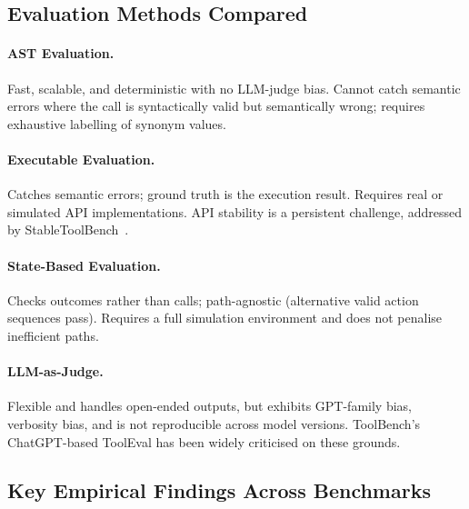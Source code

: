 \documentclass[11pt]{article}
\begin{document}
\subsection{Evaluation Methods Compared}

\paragraph{AST Evaluation.}
Fast, scalable, and deterministic with no LLM-judge bias. Cannot catch semantic errors where the
call is syntactically valid but semantically wrong; requires exhaustive labelling of synonym values.

\paragraph{Executable Evaluation.}
Catches semantic errors; ground truth is the execution result. Requires real or simulated API
implementations. API stability is a persistent challenge, addressed by
StableToolBench~\citep{guo2024stabletoolbench}.

\paragraph{State-Based Evaluation.}
Checks outcomes rather than calls; path-agnostic (alternative valid action sequences pass). Requires
a full simulation environment and does not penalise inefficient paths.

\paragraph{LLM-as-Judge.}
Flexible and handles open-ended outputs, but exhibits GPT-family bias, verbosity bias, and is not
reproducible across model versions. ToolBench's ChatGPT-based ToolEval has been widely criticised on
these grounds.

\subsection{Key Empirical Findings Across Benchmarks}
\end{document}
